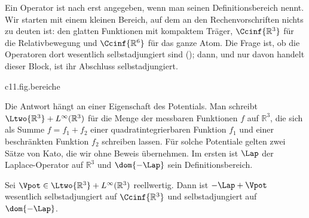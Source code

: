 \begin{fundament}[id=c11.f1,
    titel={Selbstadjungiertheit der Hamiltonoperatoren des Wasserstoffatoms},
    wozu={Im Kern sind $\op{\HamTot}$ und $\op{\HamRel}$ Rechenvorschriften für differenzierbare
      Funktionen. Hier steht, auf welchen Definitionsbereichen sie selbstadjungierte
      Operatoren festlegen, und auf welchen Satz sich das stützt.},
    voraussetzung={Kern~\ref{c11.s1} und \ref{c11.s2}; die Begriffe Definitionsbereich
      und (wesentlich) selbstadjungiert aus \defref{D16} und \defref{D19}.},
    zurueck={Die Rechenvorschriften aus \defref{D60} und
      Theorem~\ref{c11.thm.separation} legen, auf glatten Funktionen mit kompaktem
      Träger gestartet, jeweils einen selbstadjungierten Operator fest: ihren
      Abschluss.}]
  Ein Operator ist nach  erst angegeben, wenn man seinen Definitionsbereich
  nennt. Wir starten mit einem kleinen Bereich, auf dem an den Rechenvorschriften nichts
  zu deuten ist: den glatten Funktionen mit kompaktem Träger, $\Ccinf{\mathbb{R}^3}$ für
  die Relativbewegung und $\Ccinf{\mathbb{R}^6}$ für das ganze Atom. Die Frage ist, ob
  die Operatoren dort wesentlich selbstadjungiert sind (); dann, und nur
  davon handelt dieser Block, ist ihr Abschluss selbstadjungiert.

  \begin{tpcfigure}{c11.fig.bereiche}
    \caption{Die drei Funktionenmengen dieses Blocks als Schema: die glatten Funktionen mit kompaktem Träger, der Definitionsbereich $\dom{-\Lap}$ des Laplace-Operators und der ganze Raum $\Ltwo{\mathbb{R}^3}$. Eingetragen ist, was Korollar~\ref{c11.cor.relativ} über $\op{\HamRel}$ sagt.}
  \end{tpcfigure}

  Die Antwort hängt an einer Eigenschaft des Potentials. Man schreibt
  $\Ltwo{\mathbb{R}^3} + L^{\infty}(\mathbb{R}^3)$ für die Menge der messbaren Funktionen
  $f$ auf $\mathbb{R}^3$, die sich als Summe $f = f_1 + f_2$ einer quadratintegrierbaren
  Funktion $f_1$ und einer beschränkten Funktion $f_2$ schreiben lassen. Für solche
  Potentiale gelten zwei Sätze von Kato, die wir ohne Beweis übernehmen. Im ersten ist
  $\Lap$ der Laplace-Operator auf $\mathbb{R}^3$ und $\dom{-\Lap}$ sein
  Definitionsbereich.

  \begin{theorem}\label{c11.thm.kato15}
    Sei $\Vpot \in \Ltwo{\mathbb{R}^3} + L^{\infty}(\mathbb{R}^3)$ reellwertig. Dann ist
    $-\Lap + \Vpot$ wesentlich selbstadjungiert auf $\Ccinf{\mathbb{R}^3}$ und
    selbstadjungiert auf $\dom{-\Lap}$.
  \end{theorem}


\end{fundament}
